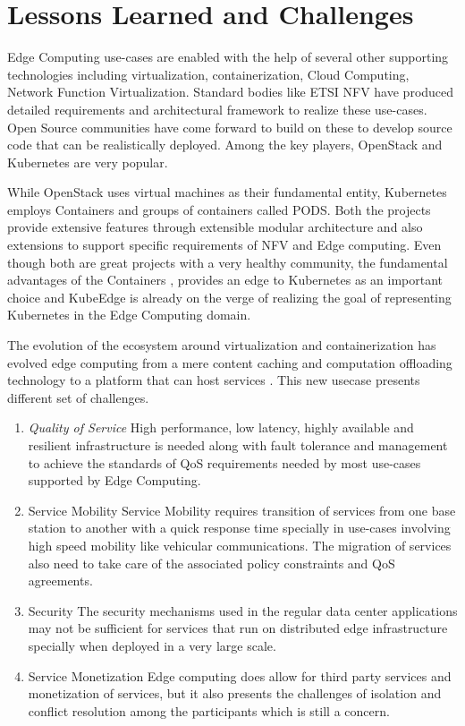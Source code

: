 \section{Lessons Learned and Challenges}

Edge Computing use-cases are enabled with the help of several other supporting technologies including virtualization, containerization, Cloud Computing, Network Function Virtualization. Standard bodies like ETSI NFV have produced detailed requirements and architectural framework to realize these use-cases. Open Source communities have come forward to build on these to develop source code that can be realistically deployed. Among the key players, OpenStack and Kubernetes are very popular.

While OpenStack uses virtual machines as their fundamental entity, Kubernetes employs Containers and groups of containers called PODS. Both the projects provide extensive features through extensible modular architecture and also extensions to support specific requirements of NFV and Edge computing. Even though both are great projects with a very healthy community, the fundamental advantages of the Containers \cite{sharma16}, provides an edge to Kubernetes as an important choice and KubeEdge is already on the verge of realizing the goal of representing Kubernetes in the Edge Computing domain.

The evolution of the ecosystem around virtualization and containerization has evolved edge computing from a mere content caching and computation offloading technology to a platform that can host services \cite{taleb17}. This new usecase presents different set of challenges. 

\begin{enumerate}
    \item \textit{Quality of Service}
         High performance, low latency, highly available and resilient infrastructure is needed along with fault tolerance and management to achieve the standards of QoS requirements needed by most use-cases supported by Edge Computing. 
    \item Service Mobility
         Service Mobility requires transition of services from one base station to another with a quick response time specially in use-cases involving high speed mobility like vehicular communications. The migration of services also need to take care of the associated policy constraints and QoS agreements.
    \item Security
         The security mechanisms used in the regular data center applications may not be sufficient for services that run on distributed edge infrastructure specially when deployed in a very large scale.
    \item Service Monetization
         Edge computing does allow for third party services and monetization of services, but it also presents the challenges of isolation and conflict resolution among the participants which is still a concern.
\end{enumerate}
